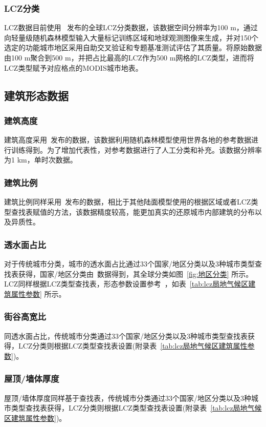 \subsubsection{LCZ分类}\label{LCZ分类}
LCZ数据目前使用~\citet{demuzere2022global} 发布的全球LCZ分类数据，该数据空间分辨率为100 m，通过向轻量级随机森林模型输入大量标记训练区域和地球观测图像来生成，并对150个选定的功能城市地区采用自助交叉验证和专题基准测试评估了其质量。将原始数据由100 m聚合到500 m，并把占比最高的LCZ作为500 m网格的LCZ类型，进而将LCZ类型赋予对应格点的MODIS城市地表。


\subsection{建筑形态数据}\label{建筑形态数据}
\subsubsection{建筑高度}\label{建筑高度}
建筑高度采用~\citet{li2022global}发布的数据，该数据利用随机森林模型使用世界各地的参考数据进行训练得到。为了增加代表性，\citet{li2022global}对参考数据进行了人工分类和补充。该数据分辨率为1 km，单时次数据。

\subsubsection{建筑比例}\label{建筑比例}
建筑比例同样采用~\citet{li2022global}发布的数据，相比于其他陆面模型使用的根据区域或者LCZ类型查找表赋值的方法，该数据精度较高，能更加真实的还原城市内部建筑的分布以及异质性。

\subsubsection{透水面占比}\label{透水面占比}
对于传统城市分类，城市的透水面占比通过33个国家/地区分类以及3种城市类型查找表获得，国家/地区分类由~\citet{oleson2020parameterization}数据得到，其全球分类如图~\ref{fig:地区分类} 所示。
LCZ同样根据LCZ类型查找表，形态参数设置参考~\citet{stewart2014evaluation}，如表~\ref{tab:lcz局地气候区建筑属性参数} 所示。

\subsubsection{街谷高宽比}\label{街谷高宽比}
同透水面占比，传统城市分类通过33个国家/地区分类以及3种城市类型查找表获得，LCZ分类则根据LCZ类型查找表设置(附录表~\ref{tab:lcz局地气候区建筑属性参数})。

\subsubsection{屋顶/墙体厚度}\label{屋顶/墙体厚度}
屋顶/墙体厚度同样基于查找表，传统城市分类通过33个国家/地区分类以及3种城市类型查找表获得，LCZ分类则根据LCZ类型查找表设置(附录表~\ref{tab:lcz局地气候区建筑属性参数})。

